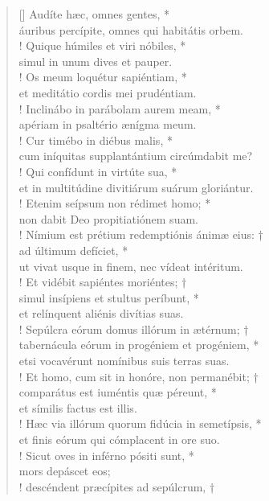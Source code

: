 \begin{verse}[\versewidth]
Audíte hæc, omnes gentes, *\\
áuribus percípite, omnes qui habitátis orbem.\\!
\vin Quique húmiles et viri nóbiles, *\\
\vin simul in unum dives et pauper.\\!
Os meum loquétur sapiéntiam, *\\
et meditátio cordis mei prudéntiam.\\!
\vin Inclinábo in parábolam aurem meam, *\\
\vin apériam in psaltério ænígma meum.\\!
Cur timébo in diébus malis, *\\
cum iníquitas supplantántium circúmdabit me?\\!
\vin Qui confídunt in virtúte sua, *\\
\vin et in multitúdine divitiárum suárum gloriántur.\\!
Etenim seípsum non rédimet homo; *\\
non dabit Deo propitiatiónem suam.\\!
\vin Nímium est prétium redemptiónis ánimæ eius: †\\
\vin ad últimum defíciet, *\\
\vin ut vivat usque in finem, nec vídeat intéritum.\\!
Et vidébit sapiéntes moriéntes; †\\
simul insípiens et stultus períbunt, *\\
et relínquent aliénis divítias suas.\\!
\vin Sepúlcra eórum domus illórum in ætérnum; †\\
\vin tabernácula eórum in progéniem et progéniem, *\\
\vin etsi vocavérunt nomínibus suis terras suas.\\!
Et homo, cum sit in honóre, non permanébit; †\\
comparátus est iuméntis quæ péreunt, *\\
et símilis factus est illis.\\!
\vin Hæc via illórum quorum fidúcia in semetípsis, *\\
\vin et finis eórum qui cómplacent in ore suo.\\!
Sicut oves in inférno pósiti sunt, *\\
mors depáscet eos;\\!
\vin descéndent præcípites ad sepúlcrum, †\\

\end{verse}
